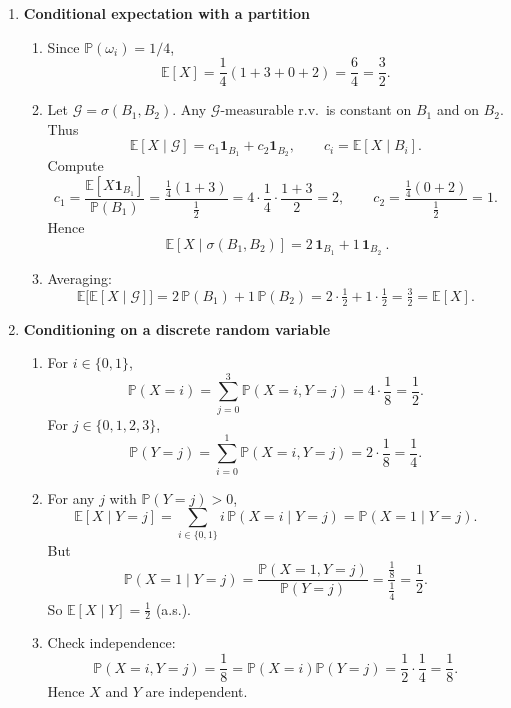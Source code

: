 \documentclass[11pt]{article}
\begin{document}
\begin{enumerate}

\item \textbf{Conditional expectation with a partition}

\begin{enumerate}
\item Since $\mathbb{P}(\omega_i)=1/4$,
\[
\mathbb{E}[X]=\frac14(1+3+0+2)=\frac64=\frac32.
\]

\item Let $\mathcal{G}=\sigma(B_1,B_2)$. Any $\mathcal{G}$-measurable r.v.\ is constant on $B_1$ and on $B_2$.
Thus
\[
\mathbb{E}[X\mid\mathcal{G}]
= c_1\mathbf{1}_{B_1}+c_2\mathbf{1}_{B_2},
\qquad
c_i=\mathbb{E}[X\mid B_i].
\]
Compute
\[
c_1=\frac{\mathbb{E}[X\mathbf{1}_{B_1}]}{\mathbb{P}(B_1)}
=\frac{\frac14(1+3)}{\frac12}=4\cdot \frac14\cdot \frac{1+3}{2}=2,
\qquad
c_2=\frac{\frac14(0+2)}{\frac12}=1.
\]
Hence
\[
\boxed{\ \mathbb{E}[X\mid\sigma(B_1,B_2)] = 2\,\mathbf{1}_{B_1}+1\,\mathbf{1}_{B_2}\ }.
\]

\item Averaging:
\[
\mathbb{E}\big[\mathbb{E}[X\mid\mathcal{G}]\big]
=2\,\mathbb{P}(B_1)+1\,\mathbb{P}(B_2)
=2\cdot \tfrac12+1\cdot\tfrac12=\tfrac32=\mathbb{E}[X].
\]
\end{enumerate}

\bigskip

\item \textbf{Conditioning on a discrete random variable}

\begin{enumerate}
\item For $i\in\{0,1\}$,
\[
\mathbb{P}(X=i)=\sum_{j=0}^3 \mathbb{P}(X=i,Y=j)=4\cdot \frac18=\frac12.
\]
For $j\in\{0,1,2,3\}$,
\[
\mathbb{P}(Y=j)=\sum_{i=0}^1 \mathbb{P}(X=i,Y=j)=2\cdot \frac18=\frac14.
\]

\item For any $j$ with $\mathbb{P}(Y=j)>0$,
\[
\mathbb{E}[X\mid Y=j]
=\sum_{i\in\{0,1\}} i\,\mathbb{P}(X=i\mid Y=j)
= \mathbb{P}(X=1\mid Y=j).
\]
But
\[
\mathbb{P}(X=1\mid Y=j)=\frac{\mathbb{P}(X=1,Y=j)}{\mathbb{P}(Y=j)}
=\frac{\frac18}{\frac14}=\frac12.
\]
So $\boxed{\mathbb{E}[X\mid Y]=\frac12}$ (a.s.).

\item Check independence:
\[
\mathbb{P}(X=i,Y=j)=\frac18
=\mathbb{P}(X=i)\mathbb{P}(Y=j)=\frac12\cdot \frac14=\frac18.
\]
Hence $X$ and $Y$ are independent.
\end{enumerate}


\end{enumerate}
\end{document}
